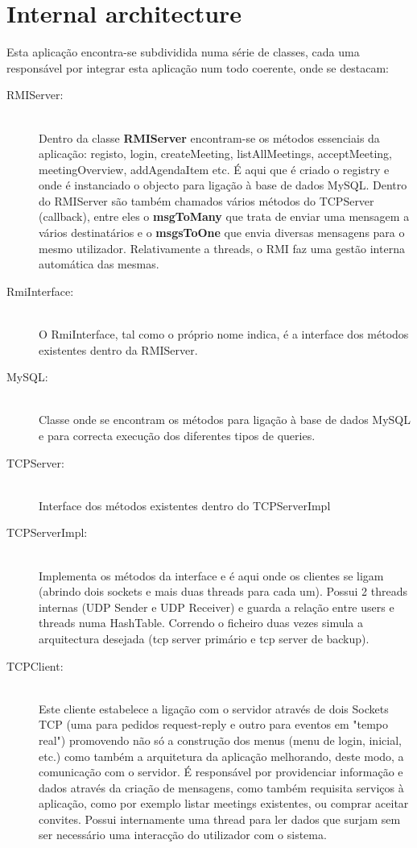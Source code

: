 \documentclass[12pt]{article} %
\begin{document}
\section{Internal architecture}
\label{sub:internal}

Esta aplicação encontra-se subdividida numa série de classes, cada uma responsável por integrar esta aplicação num todo coerente, onde se destacam:

\begin{description}
	\item[RMIServer:] \hfill \\
	Dentro da classe \textbf{RMIServer} encontram-se os métodos essenciais da aplicação: registo, login, createMeeting, listAllMeetings, acceptMeeting, meetingOverview, addAgendaItem etc. É aqui que é criado o registry e onde é instanciado o objecto para ligação à base de dados MySQL. Dentro do RMIServer são também chamados vários métodos do TCPServer (callback), entre eles o \textbf{msgToMany} que trata de enviar uma mensagem a vários destinatários e o \textbf{msgsToOne} que envia diversas mensagens para o mesmo utilizador. Relativamente a threads, o RMI faz uma gestão interna automática das mesmas.

	\item[RmiInterface:] \hfill \\
	O RmiInterface, tal como o próprio nome indica, é a interface dos métodos existentes dentro da RMIServer.
	\item[MySQL:] \hfill \\
	Classe onde se encontram os métodos para ligação à base de dados MySQL e para correcta execução dos diferentes tipos de queries.
	\item[TCPServer:] \hfill \\
	Interface dos métodos existentes dentro do TCPServerImpl
	\item[TCPServerImpl:] \hfill \\
	Implementa os métodos da interface e é aqui onde os clientes se ligam (abrindo dois sockets e mais duas threads para cada um). Possui 2 threads internas (UDP Sender e UDP Receiver) e guarda a relação entre users e threads numa HashTable. Correndo o ficheiro duas vezes simula a arquitectura desejada (tcp server primário e tcp server de backup).	
	\item[TCPClient:] \hfill \\
	Este cliente estabelece a ligação com o servidor através de dois Sockets TCP (uma para pedidos request-reply e outro para eventos em "tempo real") promovendo não só a construção dos menus (menu de login, inicial, etc.) como também a arquitetura da aplicação melhorando, deste modo, a comunicação com o servidor. É responsável por providenciar informação e dados através da criação de mensagens, como também requisita serviços à aplicação, como por exemplo listar meetings existentes, ou comprar aceitar convites.
	Possui internamente uma thread para ler dados que surjam sem ser necessário uma interacção do utilizador com o sistema.

\end{description}
\end{document}
